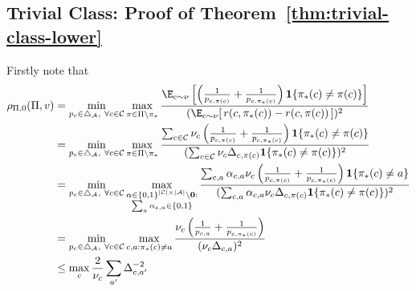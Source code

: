 \documentclass{article}
\newcommand{\mc}[1]{\mathcal{#1}}
\newcommand{\1}{\mathbf{1}}
\renewcommand{\v}{r} %
\begin{document}
\subsection{Trivial Class: Proof of Theorem~\ref{thm:trivial-class-lower}}\label{sec:supp-trivial-class}
Firstly note that \begin{align*}
    \rho_{\Pi,0}(\Pi, v) &= \min_{p_c \in \triangle_{\mc{A}}, \ \forall c \in \mc{C} }  \max_{\pi \in \Pi \setminus \pi_* } \frac{ \E_{c \sim \nu} \left[ \left(\frac{1}{p_{c,\pi(c)}}+ \frac{1}{p_{c,\pi_*(c)}}\right) \1\{\pi_*(c) \neq \pi(c) \} \right] }{(\E_{c \sim \nu}[ \, \v(c,\pi_*(c)) - \v(c,\pi(c)) \, ] )^2} \\
    &= \min_{p_c \in \triangle_{\mc{A}}, \ \forall c \in \mc{C} }  \max_{\pi \in \Pi \setminus \pi_* } \frac{ \sum_{c \in \mc{C}} \nu_c \left(\frac{1}{p_{c,\pi(c)}}+ \frac{1}{p_{c,\pi_*(c)}}\right) \1\{\pi_*(c) \neq \pi(c) \}  }{(\sum_{c \in \mc{C}} \nu_c \Delta_{c,\pi(c)} \1\{\pi_*(c) \neq \pi(c) \})^2} \\
    &= \min_{p_c \in \triangle_{\mc{A}}, \ \forall c \in \mc{C} }  \max_{\substack{\alpha \in \{0,1\}^{|\mc{C}| \times |\mc{A}|} \setminus \mathbf{0}:\\
    \sum_a \alpha_{c,a} \in \{0,1\}} } \frac{\sum_{c,a} \alpha_{c,a}\nu_c \left(\frac{1}{p_{c,\pi(c)}}+ \frac{1}{p_{c,\pi_*(c)}}\right) \1\{\pi_*(c) \neq a \}   }{(\sum_{c,a} \alpha_{c,a} \nu_c \Delta_{c,\pi(c)} \1\{\pi_*(c) \neq \pi(c) \} )^2} \\
    &= \min_{p_c \in \triangle_{\mc{A}}, \ \forall c \in \mc{C} }  \max_{c,a : \pi_*(c) \neq a} \frac{ \nu_c \left(\frac{1}{p_{c,a}}+ \frac{1}{p_{c,\pi_*(c)}}\right)  }{(\nu_c \Delta_{c,a} )^2} \\
    &\leq \max_c \frac{2}{\nu_c} \sum_{a'} \Delta_{c,a'}^{-2}

\end{align*}
\end{document}
